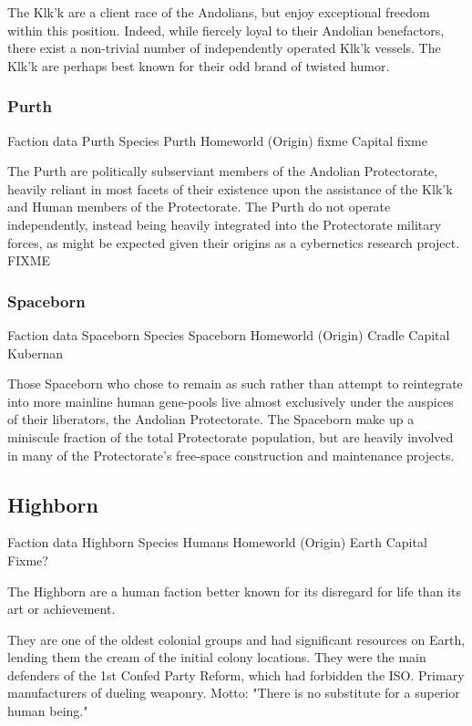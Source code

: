 The Klk'k are a client race of the Andolians, but enjoy exceptional
freedom within this position. Indeed, while fiercely loyal to their
Andolian benefactors, there exist a non-trivial number of
independently operated Klk'k vessels. The Klk'k are perhaps best known
for their odd brand of twisted humor.

\subsubsection{Purth}

Faction data 
Purth 
Species 	Purth 
Homeworld (Origin) 	fixme 
Capital 	fixme 

The Purth are politically subserviant members of the Andolian
Protectorate, heavily reliant in most facets of their existence upon
the assistance of the Klk'k and Human members of the Protectorate. The
Purth do not operate independently, instead being heavily integrated
into the Protectorate military forces, as might be expected given
their origins as a cybernetics research project.  FIXME

\subsubsection{Spaceborn}

Faction data 
Spaceborn 
Species 	Spaceborn 
Homeworld (Origin) 	Cradle
Capital 	Kubernan 

Those Spaceborn who chose to remain as such rather than attempt to
reintegrate into more mainline human gene-pools live almost
exclusively under the auspices of their liberators, the Andolian
Protectorate. The Spaceborn make up a miniscule fraction of the total
Protectorate population, but are heavily involved in many of the
Protectorate's free-space construction and maintenance projects.


\subsection{Highborn}

Faction data 
Highborn 
Species 	Humans 
Homeworld (Origin) 	Earth 
Capital 	Fixme? 

The Highborn are a human faction better known for its disregard for
life than its art or achievement.

They are one of the oldest colonial groups and had significant
resources on Earth, lending them the cream of the initial colony
locations. They were the main defenders of the 1st Confed Party
Reform, which had forbidden the ISO.  Primary manufacturers of dueling
weaponry.  Motto: "There is no substitute for a superior human being."

